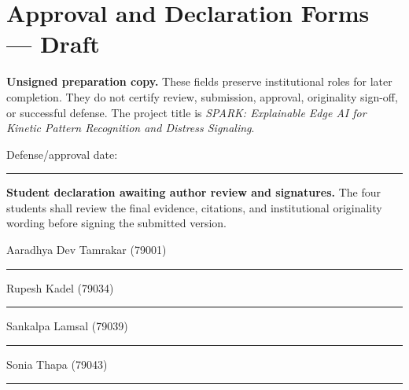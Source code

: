 \chapter*{Approval and Declaration Forms --- Draft}
\textbf{Unsigned preparation copy.} These fields preserve institutional roles for later completion. They do not certify review, submission, approval, originality sign-off, or successful defense. The project title is \textit{SPARK: Explainable Edge AI for Kinetic Pattern Recognition and Distress Signaling}.

\vspace{8mm}
\noindent\begin{minipage}[t]{0.46\textwidth}
\end{minipage}\hfill
\begin{minipage}[t]{0.46\textwidth}
\end{minipage}
\par\vspace{12mm}
\noindent\begin{minipage}[t]{0.46\textwidth}
\end{minipage}\hfill
\begin{minipage}[t]{0.46\textwidth}
\end{minipage}
\par\vspace{10mm}
Defense/approval date: \rule{5cm}{0.4pt}

\textbf{Student declaration awaiting author review and signatures.} The four students shall review the final evidence, citations, and institutional originality wording before signing the submitted version.

Aaradhya Dev Tamrakar (79001) \hfill \rule{4cm}{0.4pt}\par
Rupesh Kadel (79034) \hfill \rule{4cm}{0.4pt}\par
Sankalpa Lamsal (79039) \hfill \rule{4cm}{0.4pt}\par
Sonia Thapa (79043) \hfill \rule{4cm}{0.4pt}
